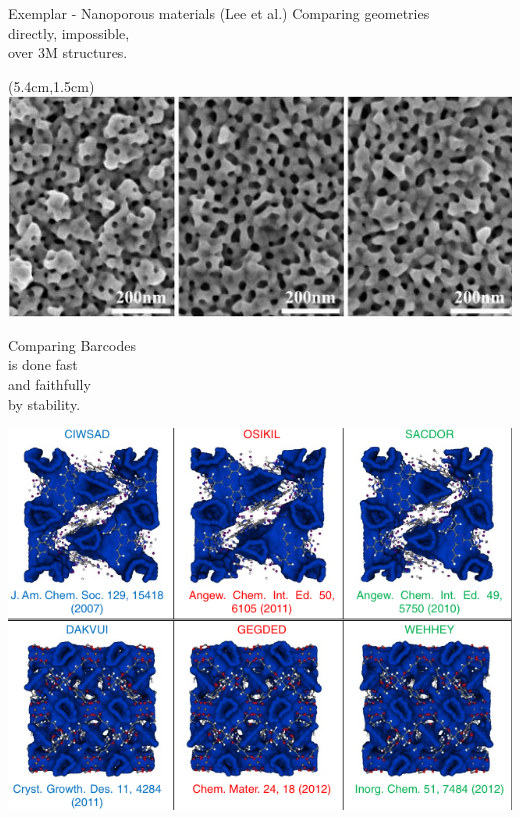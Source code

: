 \begin{frame}{Exemplar - Nanoporous materials (Lee et al.)}
	\pause
	\textcolor{pblue}{Comparing geometries} \\
	directly, impossible, \\
	over 3M structures.

	\begin{textblock*}{4cm}(5.4cm,1.5cm)
		\includegraphics[scale=.28]{aux/real_material}
	\end{textblock*}

	\pause\vspace*{2cm}
	\textcolor{pblue}{Comparing Barcodes} \\
	is done fast \\
	and faithfully \\
	by stability.

	\vspace*{-2.3cm}\hspace*{3.8cm}
	\includegraphics[scale=.6]{aux/nanoporous}
\end{frame}

